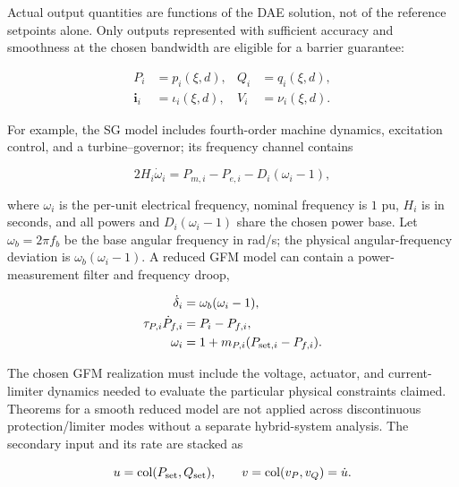 \documentclass[11pt,twocolumn]{article}
\begin{document}
Actual output quantities are functions of the DAE solution, not of the reference setpoints alone. Only outputs represented with sufficient accuracy and smoothness at the chosen bandwidth are eligible for a barrier guarantee:

\begin{equation}\label{eq:outputs}
\begin{aligned}
P_i&=p_i(\xi,d), &Q_i&=q_i(\xi,d),\\
\bm i_i&=\iota_i(\xi,d), &V_i&=\nu_i(\xi,d).
\end{aligned}
\end{equation}

For example, the SG model includes fourth-order machine dynamics, excitation control, and a turbine--governor; its frequency channel contains

\begin{equation}\label{eq:swing}
2H_i\dot\omega_i=P_{m,i}-P_{e,i}-D_i(\omega_i-1),
\end{equation}

where $\omega_i$ is the per-unit electrical frequency, nominal frequency is $1$ pu, $H_i$ is in seconds, and all powers and $D_i(\omega_i-1)$ share the chosen power base. Let $\omega_b=2\pi f_b$ be the base angular frequency in rad/s; the physical angular-frequency deviation is $\omega_b(\omega_i-1)$. A reduced GFM model can contain a power-measurement filter and frequency droop,

\begin{equation}\label{eq:gfm}
\begin{aligned}
\dot\delta_i&=\omega_b(\omega_i-1),\\
\tau_{P,i}\dot P_{f,i}&=P_i-P_{f,i},\\
\omega_i&=1+m_{P,i}(P_{{\rm set},i}-P_{f,i}).
\end{aligned}
\end{equation}

The chosen GFM realization must include the voltage, actuator, and current-limiter dynamics needed to evaluate the particular physical constraints claimed. Theorems for a smooth reduced model are not applied across discontinuous protection/limiter modes without a separate hybrid-system analysis. The secondary input and its rate are stacked as

\begin{equation}\label{eq:input}
u=\operatorname{col}(P_{\rm set},Q_{\rm set}),\qquad
v=\operatorname{col}(v_P,v_Q)=\dot u.
\end{equation}
\end{document}
